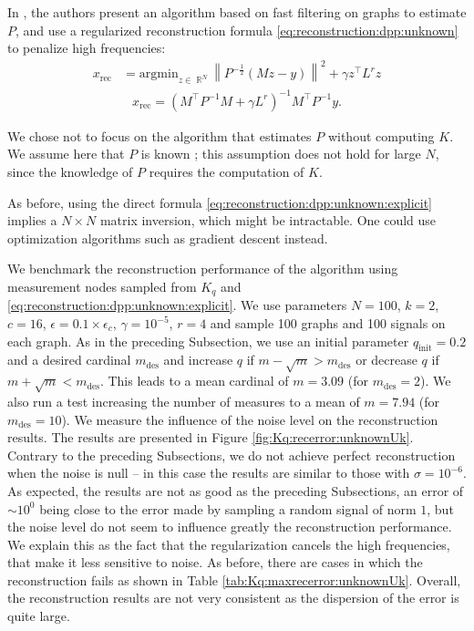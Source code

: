 \documentclass{article}
\newcommand{\norm}[1]{\left\|#1\right\|}
\DeclareMathOperator{\R}{\mathbb{R}}
\begin{document}
In \cite{tremblay2017}, the authors present an algorithm based on fast filtering on graphs to estimate $P$, and use a regularized reconstruction formula \eqref{eq:reconstruction:dpp:unknown} to penalize high frequencies:
\begin{align*}
x_\text{rec} &= \mathrm{argmin}_{z \in \R^N} \norm{P^{-\frac{1}{2}} \left( M z - y \right)}^2 + \gamma z^\top L^r z
\end{align*}
\begin{align} \boxed{x_\text{rec} = (M^\top P^{-1} M + \gamma L^r)^{-1} M^\top P^{-1} y}. \label{eq:reconstruction:dpp:unknown:explicit} \end{align}


We chose not to focus on the algorithm that estimates $P$ without computing $K$. We assume here that $P$ is known ; this assumption does not hold for large $N$, since the knowledge of $P$ requires the computation of $K$. 


As before, using the direct formula \eqref{eq:reconstruction:dpp:unknown:explicit} implies a $N \times N$ matrix inversion, which might be intractable. One could use optimization algorithms such as gradient descent instead.


We benchmark the reconstruction performance of the algorithm using measurement nodes sampled from $K_q$ and \eqref{eq:reconstruction:dpp:unknown:explicit}. We use parameters $N=100$, $k=2$, $c=16$, $\epsilon = 0.1 \times \epsilon_c$, $\gamma = 10^{-5}$, $r = 4$ and sample 100 graphs and 100 signals on each graph. As in the preceding Subsection, we use an initial parameter $q_\text{init} = 0.2$ and a desired cardinal $m_\text{des}$ and increase $q$ if $m - \sqrt{m} > m_\text{des}$ or decrease $q$ if $m + \sqrt{m} < m_\text{des}$. This leads to a mean cardinal of $m=3.09$ (for $m_\text{des} = 2$). We also run a test increasing the number of measures to a mean of $m=7.94$ (for $m_\text{des} = 10$). We measure the influence of the noise level on the reconstruction results. The results are presented in Figure \ref{fig:Kq:recerror:unknownUk}. Contrary to the preceding Subsections, we do not achieve perfect reconstruction when the noise is null -- in this case the results are similar to those with $\sigma = 10^{-6}$. As expected, the results are not as good as the preceding Subsections, an error of $\sim 10^0$ being close to the error made by sampling a random signal of norm $1$, but the noise level do not seem to influence greatly the reconstruction performance. We explain this as the fact that the regularization cancels the high frequencies, that make it less sensitive to noise. As before, there are cases in which the reconstruction fails as shown in Table \ref{tab:Kq:maxrecerror:unknownUk}. Overall, the reconstruction results are not very consistent as the dispersion of the error is quite large.
\end{document}
